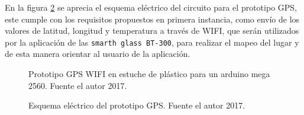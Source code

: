 \documentclass[jou]{apa6} %
\begin{document}
En la figura \ref{fig:Proto1-2} se aprecia el esquema eléctrico del circuito para el prototipo GPS, este cumple con los requisitos propuestos en primera instancia, como envío de los valores de latitud, longitud y temperatura a través de WIFI, que serán utilizados por la aplicación de las \texttt{smarth glass BT-300}, para realizar el mapeo del lugar y de esta manera orientar al usuario de la aplicación.

\begin{figure}[htb]
  \centering
\setlength\fboxsep{0pt}
\setlength\fboxrule{0.5pt}
  \caption{\footnotesize Prototipo GPS WIFI en estuche de plástico para un arduino mega 2560. Fuente el autor 2017.}
  \label{fig:Proto12}  
\end{figure}

\begin{figure}[htb]
  \centering
\setlength\fboxsep{0pt}
\setlength\fboxrule{0.5pt}
  \caption{\footnotesize Esquema eléctrico del prototipo GPS. Fuente el autor 2017.}
  \label{fig:Proto1-2}  
\end{figure}





\end{document}
